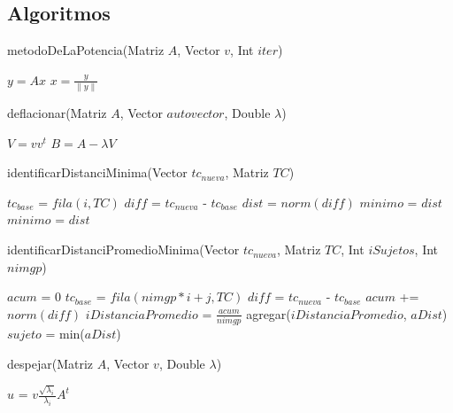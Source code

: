 \subsection{Algoritmos}

\begin{algorithm}
\caption{metodoDeLaPotencia(Matriz $A$, Vector $v$, Int $iter$)}
\label{pseudo:metodoDeLaPotencia}
\begin{algorithmic}
    \STATE $y = Ax$
    \STATE $x = \frac{y}{\parallel y \parallel}$
  \ENDFOR
\end{algorithmic}
\end{algorithm}


\begin{algorithm}
\caption{deflacionar(Matriz $A$, Vector $autovector$, Double $\lambda$)}
\label{pseudo:deflacionar}
\begin{algorithmic}
  \STATE $V = vv^t$
  \STATE $B = A - \lambda V$
\end{algorithmic}
\end{algorithm}

\begin{algorithm}
\caption{identificarDistanciMinima(Vector $tc_{nueva}$, Matriz $TC$)}
\label{pseudo:identificarDistanciMinima}
\begin{algorithmic}
    \STATE $tc_{base}$ = $fila(i, TC)$
    \STATE $diff$ = $tc_{nueva}$ - $tc_{base}$
    \STATE $dist$ = $norm(diff)$
      \STATE $minimo$ = $dist$
    \ENDIF
      \STATE $minimo$ = $dist$
    \ENDIF    
  \ENDFOR
\end{algorithmic}
\end{algorithm}

\begin{algorithm}
\caption{identificarDistanciPromedioMinima(Vector $tc_{nueva}$, Matriz $TC$, Int $iSujetos$, Int $nimgp$)}
\label{pseudo:identificarDistanciaPromedioMinima}
\begin{algorithmic}
    \STATE $acum$ = $0$
      \STATE $tc_{base}$ = $fila(nimgp*i+j, TC)$
      \STATE $diff$ = $tc_{nueva}$ - $tc_{base}$
      \STATE $acum$ += $norm(diff)$      
    \ENDFOR
    \STATE $iDistanciaPromedio$ = $\frac{acum}{nimgp}$
    \STATE agregar($iDistanciaPromedio$, $aDist$)
  \ENDFOR
  \STATE $sujeto$ = min($aDist$)
\end{algorithmic}
\end{algorithm}


\begin{algorithm}
\caption{despejar(Matriz $A$, Vector $v$, Double $\lambda$)}
\label{pseudo:despejar}
\begin{algorithmic}
  \STATE $u$ = $v\frac{ \sqrt{\lambda_{i} } }{ \lambda_{i} }  A^{t}$   
\end{algorithmic}
\end{algorithm}